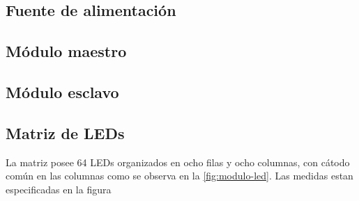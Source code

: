\subsection{Fuente de alimentación}
\subsection{Módulo maestro}
\subsection{Módulo esclavo}
\subsection{Matriz de LEDs}
La matriz posee 64 LEDs organizados en ocho filas y ocho columnas, con cátodo común en las columnas como se observa en la \ref{fig:modulo-led}. Las medidas estan especificadas en la figura 

